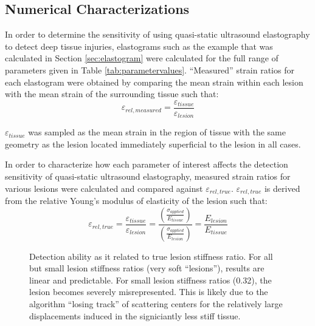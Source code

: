 		\subsection{Numerical Characterizations}
			\label{sec:numericalcharacterizations}
			In order to determine the sensitivity of using quasi-static ultrasound elastography to detect deep tissue injuries, elastograms such as the example that was calculated in Section \ref{sec:elastogram} were calculated for the full range of parameters given in Table \ref{tab:parametervalues}. ``Measured'' strain ratios for each elastogram were obtained by comparing the mean strain within each lesion with the mean  strain of the surrounding tissue such that:
			\begin{equation}
				\varepsilon_{rel,measured} = \frac{\varepsilon_{tissue}}{\varepsilon_{lesion}}
			\end{equation}

			$\varepsilon_{tissue}$ was sampled as the mean strain in the region of tissue with the same geometry as the lesion located immediately superficial to the lesion in all cases.

			In order to characterize how each parameter of interest affects the detection sensitivity of quasi-static ultrasound elastography, measured strain ratios for various lesions were calculated and compared against $\varepsilon_{rel,true}$. $\varepsilon_{rel,true}$ is derived from the relative Young's modulus of elasticity of the lesion such that:
			\begin{equation}
				\varepsilon_{rel,true} = \frac{\varepsilon_{tissue}}{\varepsilon_{lesion}} = \frac{\left(\frac{\sigma_{applied}}{E_{tissue}}\right)}{\left(\frac{\sigma_{applied}}{E_{lesion}}\right)} = \frac{E_{lesion}}{E_{tissue}}
			\end{equation}

			\begin{figure}[!t]
				\centering
				\caption[General detection sensitivity caused by lesion stiffness ratio]{Detection ability as it related to true lesion stiffness ratio. For all but small lesion stiffness ratios (very soft ``lesions''), results are linear and predictable. For small lesion stiffness ratios (0.32), the lesion becomes severely misrepresented. This is likely due to the algorithm ``losing track'' of scattering centers for the relatively large displacements induced in the signiciantly less stiff tissue.}
				\label{fig:error_stiffness_ratio}
			\end{figure}

